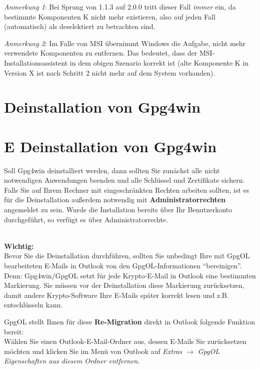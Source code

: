 \documentclass[a4paper,11pt, oneside,openright,titlepage,dvips]{scrbook}
\newcommand{\Menu}[1]{\emph{#1}}
\newcommand{\Email}{E-Mail}
\newcounter{chapter}
\begin{document}
\textit{Anmerkung 1}: Bei Sprung von 1.1.3 auf 2.0.0 tritt dieser Fall
\textit{immer} ein, da bestimmte Komponenten K nicht mehr existieren, 
also auf jeden Fall (automatisch) als deselektiert zu betrachten sind.

\textit{Anmerkung 2}: Im Falle von MSI übernimmt Windows die Aufgabe, nicht mehr verwendete
Komponenten zu entfernen.  Das bedeutet, dass der
MSI-Installationsassistent in dem obigen
Szenario korrekt ist (alte Komponente K in Version X ist nach Schritt 2 nicht
mehr auf dem System vorhanden).



\clearpage
{}
\T\chapter{Deinstallation von Gpg4win}
\W\chapter*{E Deinstallation von Gpg4win}


Soll Gpg4win deinstalliert werden,
dann sollten Sie zunächst alle nicht notwendigen
Anwendungen beenden und alle Schlüssel und Zertifikate sichern.
Falls Sie auf Ihrem Rechner mit eingeschränkten Rechten arbeiten
sollten, ist es für die Deinstallation außerdem notwendig mit
\textbf{Administratorrechten} angemeldet zu sein.
Wurde die Installation bereits über Ihr Benutzerkonto
durchgeführt, so verfügt es über Administratorrechte.

~\\
\textbf{Wichtig:}\\
Bevor Sie die Deinstallation durchführen, sollten Sie unbedingt Ihre
mit GpgOL bearbeiteten \Email{}s in Outlook von den
GpgOL-Informationen "`bereinigen"'. Denn: Gpg4win/GpgOL
setzt für jede Krypto-\Email{} in Outlook eine bestimmten Markierung.
Sie müssen vor der Deinstallation diese Markierung zurücksetzen,
damit andere Krypto-Software Ihre \Email{}s später korrekt
lesen und z.B. entschlüsseln kann.

GpgOL stellt Ihnen für diese \textbf{Re-Migration} direkt in Outlook folgende Funktion bereit:\\
Wählen Sie einen Outlook-\Email{}-Ordner aus, dessen \Email{}s Sie
zurücksetzen möchten und klicken Sie im Menü von Outlook auf 
\Menu{Extras $\rightarrow$ GpgOL Eigenschaften aus diesem Ordner entfernen}.
\end{document}
